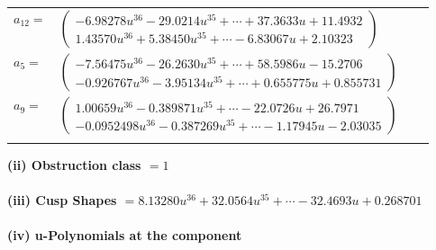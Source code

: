 \documentclass[1p]{elsarticle_modified}
\theoremstyle{definition}
\begin{document}
\begin{tabular}{m{7pt} m{180pt} m{7pt} m{180pt} }
\flushright $a_{12}=$&$\begin{pmatrix}-6.98278 u^{36}-29.0214 u^{35}+\cdots+37.3633 u+11.4932\\1.43570 u^{36}+5.38450 u^{35}+\cdots-6.83067 u+2.10323\end{pmatrix}$ \\
\flushright $a_{5}=$&$\begin{pmatrix}-7.56475 u^{36}-26.2630 u^{35}+\cdots+58.5986 u-15.2706\\-0.926767 u^{36}-3.95134 u^{35}+\cdots+0.655775 u+0.855731\end{pmatrix}$ \\
\flushright $a_{9}=$&$\begin{pmatrix}1.00659 u^{36}-0.389871 u^{35}+\cdots-22.0726 u+26.7971\\-0.0952498 u^{36}-0.387269 u^{35}+\cdots-1.17945 u-2.03035\end{pmatrix}$\\&\end{tabular}
\flushleft \textbf{(ii) Obstruction class $= 1$}\\~\\
\flushleft \textbf{(iii) Cusp Shapes $= 8.13280 u^{36}+32.0564 u^{35}+\cdots-32.4693 u+0.268701$}\\~\\
\newpage\renewcommand{\arraystretch}{1}
\flushleft \textbf{(iv) u-Polynomials at the component}\newline \\
\end{document}
